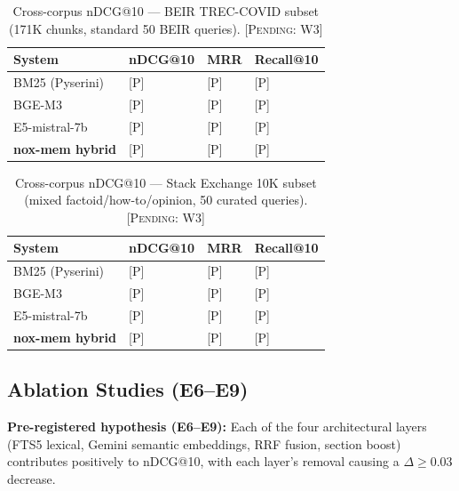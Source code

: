 \documentclass{article}
\begin{document}
\begin{table}[t]
  \caption{Cross-corpus nDCG@10 --- BEIR TREC-COVID subset
    (171K chunks, standard 50 BEIR queries). \textsc{[Pending: W3]}}
  \label{tab:beir}
  \centering
  \begin{tabular}{llll}
    \toprule
    System & nDCG@10 & MRR & Recall@10 \\
    \midrule
    BM25 (Pyserini)  & {[}P{]} & {[}P{]} & {[}P{]} \\
    BGE-M3           & {[}P{]} & {[}P{]} & {[}P{]} \\
    E5-mistral-7b    & {[}P{]} & {[}P{]} & {[}P{]} \\
    \textbf{nox-mem hybrid} & {[}P{]} & {[}P{]} & {[}P{]} \\
    \bottomrule
  \end{tabular}
\end{table}

\begin{table}[t]
  \caption{Cross-corpus nDCG@10 --- Stack Exchange 10K subset
    (mixed factoid/how-to/opinion, 50 curated queries). \textsc{[Pending: W3]}}
  \label{tab:stackex}
  \centering
  \begin{tabular}{llll}
    \toprule
    System & nDCG@10 & MRR & Recall@10 \\
    \midrule
    BM25 (Pyserini)  & {[}P{]} & {[}P{]} & {[}P{]} \\
    BGE-M3           & {[}P{]} & {[}P{]} & {[}P{]} \\
    E5-mistral-7b    & {[}P{]} & {[}P{]} & {[}P{]} \\
    \textbf{nox-mem hybrid} & {[}P{]} & {[}P{]} & {[}P{]} \\
    \bottomrule
  \end{tabular}
\end{table}

\subsection{Ablation Studies (E6--E9)}

\textbf{Pre-registered hypothesis (E6--E9):} Each of the four architectural layers (FTS5
lexical, Gemini semantic embeddings, RRF fusion, section boost) contributes positively to
nDCG@10, with each layer's removal causing a $\Delta \geq 0.03$ decrease.
\end{document}
